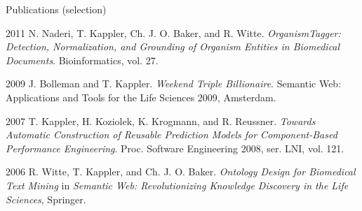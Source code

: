 \begin{cv}{}
  \begin{cvlist}{Publications (selection)}
    \item[2011] N. Naderi, T. Kappler, Ch. J. O. Baker, and R.
      Witte. \emph{OrganismTagger: Detection, Normalization, and
        Grounding of Organism Entities in Biomedical Documents}.
      Bioinformatics, vol. 27.
  \item[2009] J. Bolleman and T. Kappler. \emph{Weekend Triple
      Billionaire}. Semantic Web: Applications and Tools for the Life
    Sciences 2009, Amsterdam.
  \item[2007] T. Kappler, H. Koziolek, K. Krogmann, and
    R. Reussner.  \emph{Towards Automatic Construction of Reusable
      Prediction Models for Component-Based Performance Engineering}.
    Proc. Software Engineering 2008, ser. LNI, vol. 121.
  \item[2006] R. Witte, T. Kappler, and Ch. J. O. Baker.
    \emph{Ontology Design for Biomedical Text Mining} in
    \emph{Semantic Web: Revolutionizing Knowledge Discovery in the
      Life Sciences}, Springer.
  \end{cvlist}


\end{cv}
